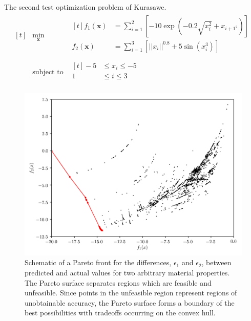 The second test optimization problem of Kurasawe.
\begin{equation}
\begin{aligned}[t]
  &\min_{\bm{x}}
    &\begin{aligned}[t]
      f_1(\bm{x}) &= \sum_{i=1}^2
          \left[
            -10 \exp\left(-0.2 \sqrt{x_i^2} + x_{i+1^2}\right)
          \right] \\
      f_2(\bm{x}) &= \sum_{i=1}^3 \left[ \vert|x_{i} \vert|^{0.8} + 5\sin(x_i^3)\right] \\
    \end{aligned}
  \\
  &\text{subject to}
    &\begin{aligned}[t]
		      -5 &\leq x_i \leq -5 \\
      		 1 &\leq i   \leq  3 \\
    \end{aligned}
  \end{aligned}
\end{equation}

\begin{figure}[h]
	\centering
  \includegraphics{chapter3/kurasawe_cg}
  \caption{Schematic of a Pareto front for the differences, $\epsilon_1$ and $\epsilon_2$, between predicted and actual values for two arbitrary material properties.  The Pareto surface separates regions which are feasible and unfeasible.  Since points in the unfeasible region represent regions of unobtainable accuracy, the Pareto surface forms a boundary of the best possibilities with tradeoffs occurring on the convex hull. }
  \label{fig:kurasawe_cg}
\end{figure}

